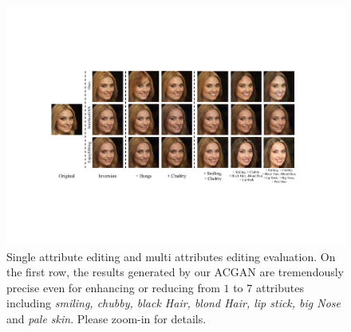 \begin{figure}[!t]
     \begin{center}
        \includegraphics[width=1\linewidth]{figures/ACGAN/FaceMulti_center.pdf}
     \end{center}
     \caption{Single attribute editing and multi attributes editing evaluation. On the first row, the results generated by our ACGAN are tremendously precise even for enhancing or reducing from $1$ to $7$ attributes including \textit{smiling, chubby, black Hair, blond Hair, lip stick, big Nose} and \textit{pale skin}. Please zoom-in for details.}
     \label{fig:face}
\end{figure}

